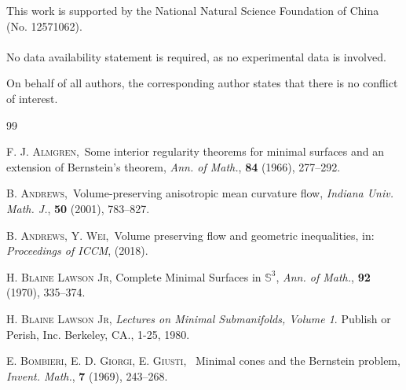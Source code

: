 \documentclass[reqno,11pt, letterpaper]{amsart}
\theoremstyle{plain}
\theoremstyle{definition}
\numberwithin{equation}{section}
\begin{document}
This work is supported by the National Natural Science Foundation of China (No. 12571062).\\
\\
 No data availability statement is required, as no experimental data is involved.

 On behalf of all authors, the corresponding author states that there is no conflict of
interest.




\begin{thebibliography}{99}

 {\small \textsc{F. J. Almgren,}\ Some interior regularity theorems for minimal surfaces and an extension of Bernstein's theorem, \emph{Ann. of Math.}, {\bf 84} (1966), 277--292. }

 {\small \textsc{B. Andrews,}\ Volume-preserving anisotropic mean curvature flow, \emph{Indiana Univ. Math. J.}, {\bf 50} (2001), 783--827. }

 {\small \textsc{B. Andrews, Y. Wei,}\ Volume preserving flow and geometric inequalities, in: \emph{Proceedings of ICCM},  (2018). }

 {\small \textsc{H. Blaine Lawson Jr}, Complete Minimal Surfaces in $\mathbb{S}^3$, \emph{Ann. of Math.}, {\bf 92} (1970), 335--374.}

 {\small \textsc{H. Blaine Lawson Jr}, \emph{Lectures on Minimal Submanifolds, Volume 1}. Publish or Perish, Inc. Berkeley, CA., 1-25, 1980.}

 {\small \textsc{E. Bombieri, E. D. Giorgi, E. Giusti}, \ Minimal cones and the Bernstein problem, \emph{Invent. Math.}, {\bf 7} (1969), 243--268. }






\end{thebibliography}
\end{document}
